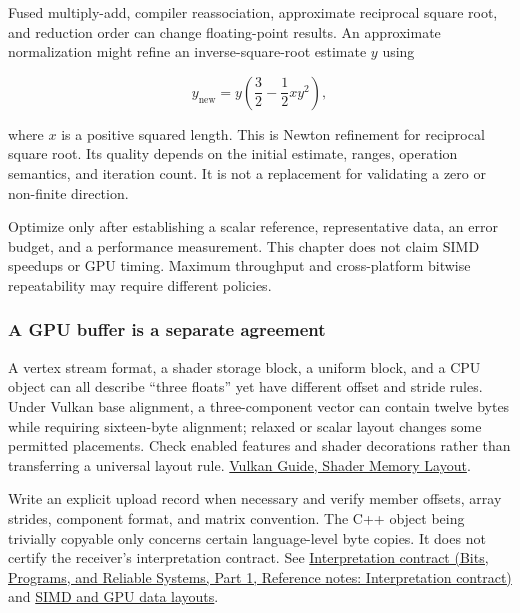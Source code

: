 Fused multiply-add, compiler reassociation, approximate reciprocal square root, and reduction order can change floating-point results. An approximate normalization might refine an inverse-square-root estimate \(y\) using

\[
y_{\mathrm{new}}=y\left(\frac32-\frac12xy^2\right),
\]

where \(x\) is a positive squared length. This is Newton refinement for reciprocal square root. Its quality depends on the initial estimate, ranges, operation semantics, and iteration count. It is not a replacement for validating a zero or non-finite direction.

Optimize only after establishing a scalar reference, representative data, an error budget, and a performance measurement. This chapter does not claim SIMD speedups or GPU timing. Maximum throughput and cross-platform bitwise repeatability may require different policies.

\subsubsection{A GPU buffer is a separate agreement}\label{02-foundations-ii-ch037-a-gpu-buffer-is-a-separate-agreement}

\hypertarget{02-foundations-ii-ch037-a-gpu-buffer-is-a-separate-agreement}{}

A vertex stream format, a shader storage block, a uniform block, and a CPU object can all describe ``three floats'' yet have different offset and stride rules. Under Vulkan base alignment, a three-component vector can contain twelve bytes while requiring sixteen-byte alignment; relaxed or scalar layout changes some permitted placements. Check enabled features and shader decorations rather than transferring a universal  layout rule. \href{https://docs.vulkan.org/guide/latest/shader_memory_layout.html}{Vulkan Guide, Shader Memory Layout}.

Write an explicit upload record when necessary and verify member offsets, array strides, component format, and matrix convention. The C++ object being trivially copyable only concerns certain language-level byte copies. It does not certify the receiver's interpretation contract. See \href{../01-Bits-Programs-and-Reliable-Systems-P01/main.pdf\#nameddest=appendix-f414bd4ed05c}{Interpretation contract (Bits, Programs, and Reliable Systems, Part 1, Reference notes: Interpretation contract)} and \hyperref[appendix-3c7b1a56de01]{SIMD and GPU data layouts}.

